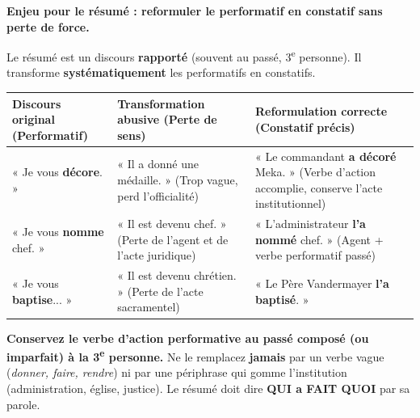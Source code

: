 \documentclass[11pt]{article}
\begin{document}
\textbf{Enjeu pour le résumé : reformuler le performatif en constatif sans perte de force.}\par
Le résumé est un discours \textbf{rapporté} (souvent au passé, 3\textsuperscript{e} personne). Il transforme \textbf{systématiquement} les performatifs en constatifs.
\begin{center}
\begin{tabularx}{\linewidth}{|>{\raggedright\arraybackslash}X|>{\raggedright\arraybackslash}X|>{\raggedright\arraybackslash}X|}
\hline
\rowcolor{popblueL} \textbf{Discours original (Performatif)} & \textbf{Transformation abusive (Perte de sens)} & \textbf{Reformulation correcte (Constatif précis)} \\
\hline
« Je vous \textbf{décore}. » & « Il a donné une médaille. » (Trop vague, perd l'officialité) & « Le commandant \textbf{a décoré} Meka. » (Verbe d'action accomplie, conserve l'acte institutionnel) \\
\hline
« Je vous \textbf{nomme} chef. » & « Il est devenu chef. » (Perte de l'agent et de l'acte juridique) & « L'administrateur \textbf{l'a nommé} chef. » (Agent + verbe performatif passé) \\
\hline
« Je vous \textbf{baptise}... » & « Il est devenu chrétien. » (Perte de l'acte sacramentel) & « Le Père Vandermayer \textbf{l'a baptisé}. » \\
\hline
\end{tabularx}
\end{center}

\begin{aretenir}
\textbf{Conservez le verbe d'action performative au passé composé (ou imparfait) à la 3\textsuperscript{e} personne.}
Ne le remplacez \textbf{jamais} par un verbe vague (\emph{donner, faire, rendre}) ni par une périphrase qui gomme l'institution (administration, église, justice). Le résumé doit dire \textbf{QUI a FAIT QUOI} par sa parole.
\end{aretenir}
\end{document}
